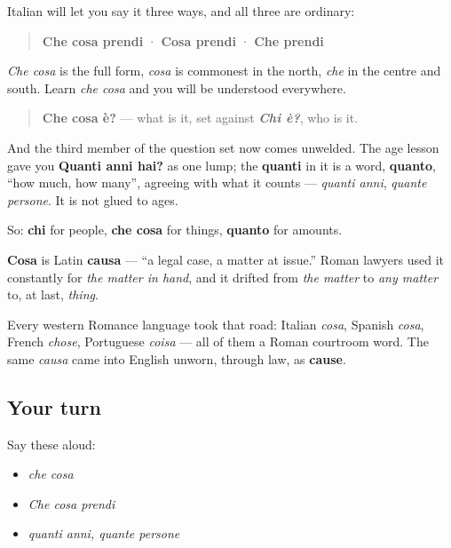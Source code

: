 Italian will let you say it three ways, and all three are ordinary:

\begin{quote}
\textbf{Che cosa prendi} · \textbf{Cosa prendi} · \textbf{Che prendi}
\end{quote}

\emph{Che cosa} is the full form, \emph{cosa} is commonest in the north, \emph{che} in the centre and south. Learn \emph{che cosa} and you will be understood everywhere.

\begin{quote}
\textbf{Che cosa è?} — what is it, set against \emph{\textbf{Chi è?}}, who is it.
\end{quote}

And the third member of the question set now comes unwelded. The age lesson gave you \textbf{Quanti anni hai?} as one lump; the \textbf{quanti} in it is a word, \textbf{quanto}, \textquotedblleft{}how much, how many\textquotedblright{}, agreeing with what it counts — \emph{quanti anni}, \emph{quante persone}. It is not glued to ages.

So: \textbf{chi} for people, \textbf{che cosa} for things, \textbf{quanto} for amounts.

\begin{cousinweb}
\textbf{Cosa} is Latin \textbf{causa} — \textquotedblleft{}a legal case, a matter at issue.\textquotedblright{} Roman lawyers used it constantly for \emph{the matter in hand}, and it drifted from \emph{the matter} to \emph{any matter} to, at last, \emph{thing}.

Every western Romance language took that road: Italian \emph{cosa}, Spanish \emph{cosa}, French \emph{chose}, Portuguese \emph{coisa} — all of them a Roman courtroom word. The same \emph{causa} came into English unworn, through law, as \textbf{cause}.
\end{cousinweb}

\subsection*{Your turn}
Say these aloud:

\begin{itemize}
\raggedright
  \item \emph{che cosa}
  \item \emph{Che cosa prendi}
  \item \emph{quanti anni, quante persone}
\end{itemize}

